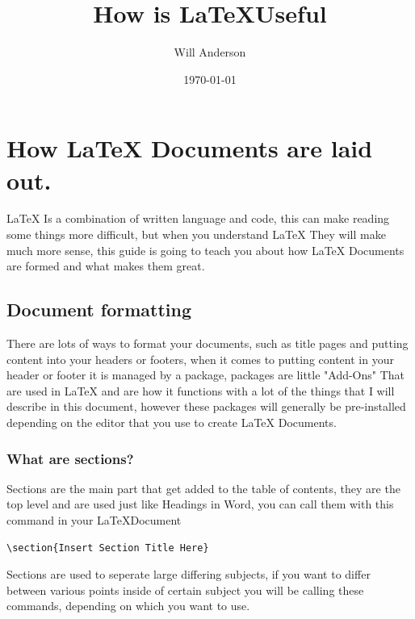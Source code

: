 \documentclass[12pt, letterpaper, oneside]{article} \usepackage[utf8]{inputenc}
\title{How is \LaTeX Useful}
\author{Will Anderson}
\date{\today}
\begin{document}
\maketitle

\newpage

\tableofcontents

\listoffigures

\newpage

\section{How \LaTeX{} Documents are laid out.}

\LaTeX{} Is a combination of written language and code, this can make reading some things more difficult, but when you understand \LaTeX{} They will make much more sense, this guide is going to teach you about how \LaTeX{} Documents are formed and what makes them great.

\subsection{Document formatting}

There are lots of ways to format your documents, such as title pages and putting content into your headers or footers, when it comes to putting content in your header or footer it is managed by a package, packages are little "Add-Ons" That are used in \LaTeX{} and are how it functions with a lot of the things that I will describe in this document, however these packages will generally be pre-installed depending on the editor that you use to create \LaTeX{} Documents.



\subsubsection{What are sections?}

Sections are the main part that get added to the table of contents, they are the top level and are used just like Headings in Word, you can call them with this command in your \LaTeX Document
\begin{lstlisting}
\section{Insert Section Title Here}
\end{lstlisting}

Sections are used to seperate large differing subjects, if you want to differ between various points inside of certain subject you will be calling these commands, depending on which you want to use. 
\end{document}
